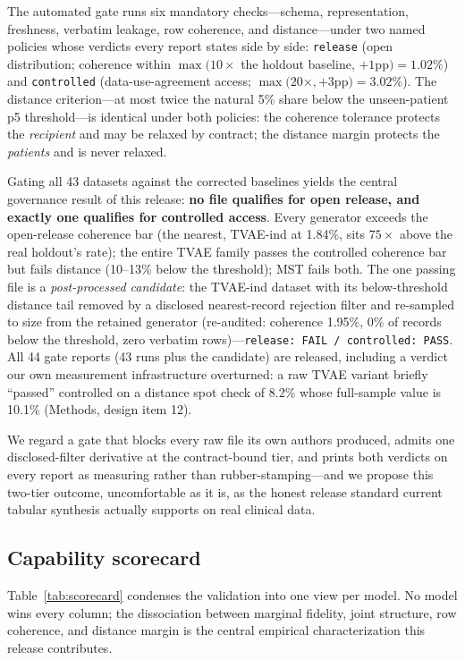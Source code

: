 \documentclass[11pt,a4paper]{article}
\begin{document}
The automated gate runs six mandatory checks---schema, representation, freshness,
verbatim leakage, row coherence, and distance---under two named policies whose
verdicts every report states side by side: \texttt{release} (open distribution;
coherence within $\max(10\times$ the holdout baseline, $+1$pp$) = 1.02\%$) and
\texttt{controlled} (data-use-agreement access; $\max(20\times, +3$pp$) =
3.02\%$). The distance criterion---at most twice the natural 5\% share below the
unseen-patient p5 threshold---is identical under both policies: the coherence
tolerance protects the \emph{recipient} and may be relaxed by contract; the
distance margin protects the \emph{patients} and is never relaxed.

Gating all 43 datasets against the corrected baselines yields the central
governance result of this release: \textbf{no file qualifies for open release,
and exactly one qualifies for controlled access}. Every generator exceeds the
open-release coherence bar (the nearest, TVAE-ind at 1.84\%, sits $75\times$
above the real holdout's rate); the entire TVAE family passes the controlled
coherence bar but fails distance (10--13\% below the threshold); MST fails both.
The one passing file is a \emph{post-processed candidate}: the TVAE-ind dataset
with its below-threshold distance tail removed by a disclosed nearest-record
rejection filter and re-sampled to size from the retained generator
(re-audited: coherence 1.95\%, 0\% of records below the threshold, zero verbatim
rows)---\texttt{release: FAIL / controlled: PASS}. All 44 gate reports (43 runs
plus the candidate) are released, including a verdict our own measurement
infrastructure overturned: a raw TVAE variant briefly ``passed'' controlled on a
distance spot check of 8.2\% whose full-sample value is 10.1\% (Methods,
design item 12).

We regard a gate that blocks every raw file its own authors produced, admits one
disclosed-filter derivative at the contract-bound tier, and prints both verdicts
on every report as measuring rather than rubber-stamping---and we propose this
two-tier outcome, uncomfortable as it is, as the honest release standard current
tabular synthesis actually supports on real clinical data.

\subsection{Capability scorecard}

Table~\ref{tab:scorecard} condenses the validation into one view per model. No
model wins every column; the dissociation between marginal fidelity, joint
structure, row coherence, and distance margin is the central empirical
characterization this release contributes.
\end{document}
